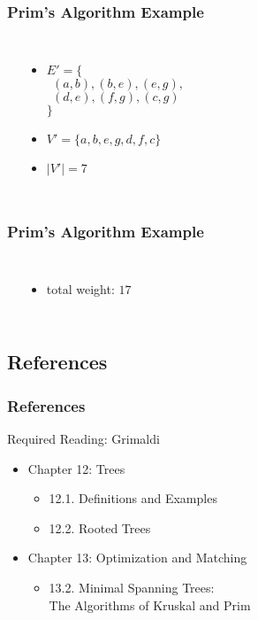 \documentclass[dvipsnames]{beamer}
\begin{document}
\begin{frame}
  \frametitle{Prim's Algorithm Example}

  \begin{columns}
    \begin{center}
    \end{center}

    \pause
    \begin{itemize}
      \item $E' = \{$\\
        $~~(a,b), (b,e), (e,g),$\\
        $~~(d,e), (f,g), (c,g)$\\
        $\}$
      \item $V' = \{ a, b, e, g, d, f, c \}$
      \item $|V'| = 7$
    \end{itemize}
  \end{columns}
\end{frame}

\begin{frame}
  \frametitle{Prim's Algorithm Example}

  \begin{columns}
    \begin{center}
    \end{center}

    \begin{itemize}
      \item total weight: $17$
    \end{itemize}
  \end{columns}
\end{frame}

\subsection*{References}

\begin{frame}
  \frametitle{References}

  \begin{block}{Required Reading: Grimaldi}
    \begin{itemize}
      \item Chapter 12: Trees
      \begin{itemize}
        \item 12.1. \alert{Definitions and Examples}
        \item 12.2. \alert{Rooted Trees}
      \end{itemize}

      \item Chapter 13: Optimization and Matching
      \begin{itemize}
        \item 13.2. \alert{Minimal Spanning Trees:\\
                           The Algorithms of Kruskal and Prim}
      \end{itemize}
    \end{itemize}
  \end{block}
\end{frame}
\end{document}
